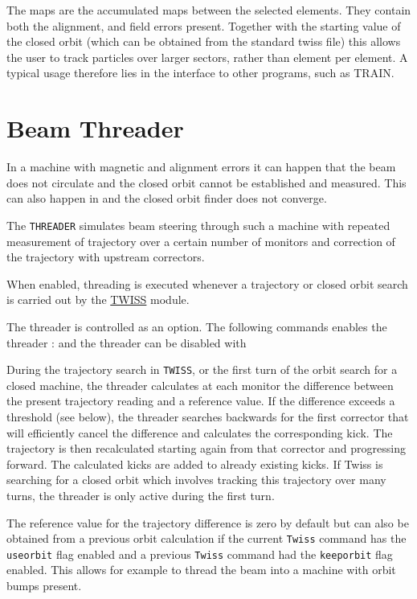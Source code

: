 The maps are the accumulated maps between the selected elements. They
contain both the alignment, and field errors present. Together with the
starting value of the closed orbit (which can be obtained from the
standard twiss file) this allows the user to track particles over larger
sectors, rather than element per element. A typical usage therefore lies
in the interface to other programs, such as TRAIN.  


%

\section{Beam Threader}
\label{sec:threader}

In a machine with magnetic and alignment errors it can happen that the
beam does not circulate and the closed orbit cannot be established and
measured. This can also happen in \madx and the closed orbit finder does
not converge. 

The \texttt{THREADER} simulates beam steering through such a machine
with repeated measurement of trajectory over a certain number of
monitors and correction of the trajectory with upstream correctors.   

When enabled, threading is executed whenever a trajectory or closed
orbit search is carried out by the \href{../twiss/twiss.html}{TWISS}
module.   

The threader is controlled as an option. 
The following \madx commands enables the threader :
and the threader can be disabled with

During the trajectory search in \texttt{TWISS}, or the first turn of the
orbit search for a closed machine, the threader calculates at each
monitor the difference between the present trajectory reading and a
reference value.   
If the difference exceeds a threshold (see below), the threader searches
backwards for the first corrector that will efficiently cancel the
difference and calculates the corresponding kick. The trajectory is then
recalculated starting again from that corrector and progressing
forward. The calculated kicks are added to already existing kicks. If
Twiss is searching for a closed orbit which involves tracking this
trajectory over many turns, the threader is only active during the first
turn.  

The reference value for the trajectory difference is zero by default but
can also be obtained from a previous orbit calculation if the current
{\tt Twiss} command has the {\tt useorbit} flag enabled and a previous
{\tt Twiss} command had the {\tt keeporbit} flag enabled. This allows
for example to thread the beam into a machine with orbit bumps present.  

